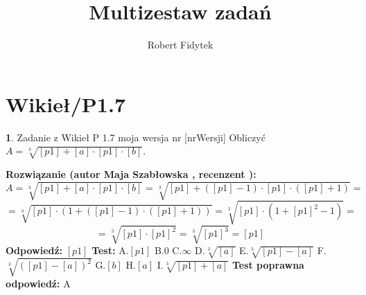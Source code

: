 \documentclass[12pt, a4paper]{article}
\title{Multizestaw zadań}
\author{Robert Fidytek}
\date{}
\theoremstyle{definition} %
\newtheorem{zad}{}
\newcommand{\kategoria}[1]{\section{#1}} %
\newcommand{\zadStart}[1]{\begin{zad}#1\newline} %
\newcommand{\zadStop}{\end{zad}}   %
\newcommand{\rozwStart}[2]{\noindent \textbf{Rozwiązanie (autor #1 , recenzent #2): }\newline} %
\newcommand{\rozwStop}{\newline}                                            %
\newcommand{\odpStart}{\noindent \textbf{Odpowiedź:}\newline}    %
\newcommand{\odpStop}{\newline}                                             %
\newcommand{\testStart}{\noindent \textbf{Test:}\newline} %
\newcommand{\testStop}{\newline} %
\newcommand{\kluczStart}{\noindent \textbf{Test poprawna odpowiedź:}\newline} %
\newcommand{\kluczStop}{\newline} %
\begin{document}
\maketitle


\kategoria{Wikieł/P1.7}
\zadStart{Zadanie z Wikieł P 1.7 moja wersja nr [nrWersji]}
Obliczyć  $A=\sqrt[3]{[p1]+[a]\cdot[p1]\cdot[b]}$.
\zadStop
\rozwStart{Maja Szabłowska}{}
$$A=\sqrt[3]{[p1]+[a]\cdot[p1]\cdot[b]}=\sqrt[3]{[p1]+([p1]-1)\cdot[p1]\cdot([p1]+1)}=$$
$$=\sqrt[3]{[p1]\cdot(1+([p1]-1)\cdot([p1]+1))}=\sqrt[3]{[p1]\cdot(1+[p1]^{2}-1)}=$$
$$=\sqrt[3]{[p1]\cdot[p1]^{2}}=\sqrt[3]{[p1]^{3}}=[p1] $$
\rozwStop
\odpStart
$[p1]$
\odpStop
\testStart
A.$[p1]$
B.$0$
C.$\infty$
D.$\sqrt[3]{[a]}$
E.$\sqrt[3]{[p1]-[a]}$
F.$\sqrt[3]{([p1]-[a])^{2}}$
G.$[b]$
H.$[a]$
I.$\sqrt[3]{[p1]+[a]}$
\testStop
\kluczStart
A
\kluczStop
\end{document}
